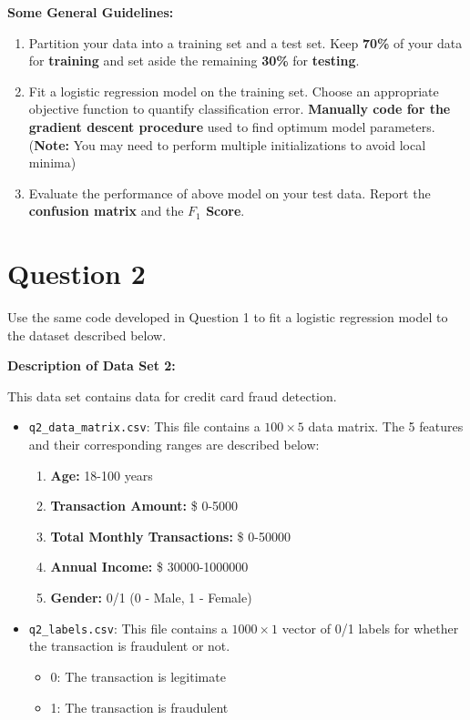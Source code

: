 \documentclass[11pt,a4paper]{article}
\begin{document}
	\textbf{Some General Guidelines:}
	
	\begin{enumerate}
		\item Partition your data into a training set and a test set. Keep \textbf{70\%} of your data for \textbf{training} and set aside the remaining \textbf{30\%} for \textbf{testing}.
		\item Fit a logistic regression model on the training set. Choose an appropriate objective function to quantify classification error. \textbf{Manually code for the gradient descent procedure} used to find optimum model parameters. (\textbf{Note:} You may need to perform multiple initializations to avoid local minima)
		\item Evaluate the performance of above model on your test data. Report the \textbf{confusion matrix} and the \textbf{$ F_1 $ Score}.
	\end{enumerate}

	\section*{Question 2}
	
	Use the same code developed in Question 1 to fit a logistic regression model to the dataset described below.
	
	\textbf{Description of Data Set 2:}
	
	This data set contains data for credit card fraud detection. 
	
	\begin{itemize}
		\item \texttt{q2\_data\_matrix.csv}: This file contains a $ 100 \times 5 $ data matrix. The 5 features and their corresponding ranges are described below:
		\begin{enumerate}
			\item \textbf{Age:} 18-100 years
			\item \textbf{Transaction Amount:} \$ 0-5000
			\item \textbf{Total Monthly Transactions:} \$ 0-50000
			\item \textbf{Annual Income:} \$ 30000-1000000
			\item \textbf{Gender:} 0/1 (0 - Male, 1 - Female)
		\end{enumerate}
		\item \texttt{q2\_labels.csv}: This file contains a $ 1000 \times 1 $ vector of 0/1 labels for whether the transaction is fraudulent or not. 
		\begin{itemize}
			\item 0: The transaction is legitimate
			\item 1: The transaction is fraudulent
		\end{itemize}
	\end{itemize}
\end{document}
